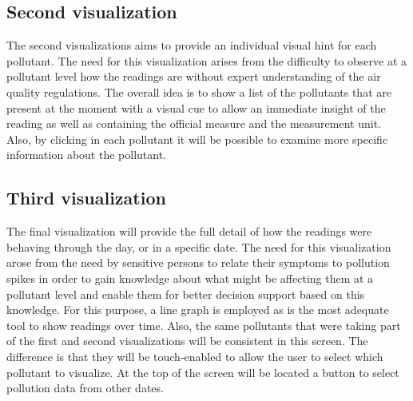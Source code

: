 \subsection{Second visualization}

The second visualizations aims to provide an individual visual hint for each pollutant. The need for this visualization arises from the difficulty to observe at a pollutant level how the readings are without expert understanding of the air quality regulations. The overall idea is to show a list of the pollutants that are present at the moment with a visual cue to allow an immediate insight of the reading as well as containing the official measure and the measurement unit. Also, by clicking in each pollutant it will be possible to examine more specific information about the pollutant.

\subsection{Third visualization}

The final visualization will provide the full detail of how the readings were behaving through the day, or in a specific date. The need for this visualization arose from the need by sensitive persons to relate their symptoms to pollution spikes in order to gain knowledge about what might be affecting them at a pollutant level and enable them for better decision support based on this knowledge. For this purpose, a line graph is employed as is the most adequate tool to show readings over time. Also, the same pollutants that were taking part of the first and second visualizations will be consistent in this screen. The difference is that they will be touch-enabled to allow the user to select which  pollutant to visualize. At the top of the screen will be located a button to select pollution data from other dates. 
